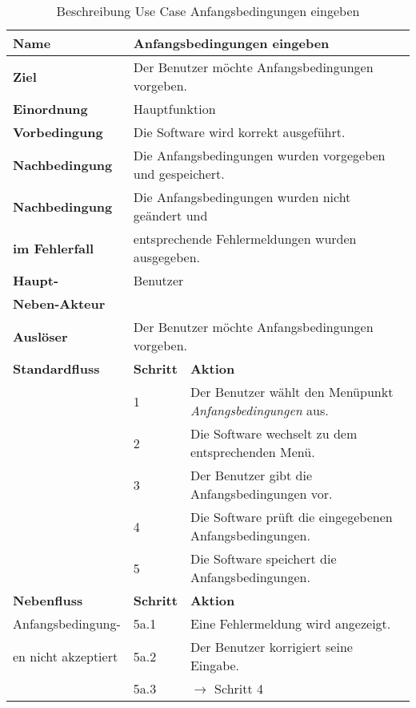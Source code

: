 \begin{table} [H]
	\centering
	\begin{tabular}{|l|l|l|}
		\hline
		\textbf{Name} 			& \multicolumn{2}{|l|}{Anfangsbedingungen eingeben}  \\
		\hline
		\textbf{Ziel} 			& \multicolumn{2}{|l|}{Der Benutzer möchte Anfangsbedingungen vorgeben. }\\ 
		\hline
		\textbf{Einordnung}		& \multicolumn{2}{|l|}{Hauptfunktion}\\
		\hline
		\textbf{Vorbedingung}	& \multicolumn{2}{|l|}{Die Software wird korrekt ausgeführt.} \\
		\hline
		\textbf{Nachbedingung}	& \multicolumn{2}{|l|}{Die Anfangsbedingungen wurden vorgegeben und gespeichert.}\\
		\hline
		\textbf{Nachbedingung} 	& \multicolumn{2}{|l|}{Die Anfangsbedingungen wurden nicht geändert und}\\
		\textbf{im Fehlerfall}	& \multicolumn{2}{|l|}{entsprechende Fehlermeldungen wurden ausgegeben.}\\
		\hline
		\textbf{Haupt-} 			& \multicolumn{2}{|l|}{Benutzer}\\
		\textbf{Neben-Akteur}	& \multicolumn{2}{|l|}{	}			\\
		\hline
		\textbf{Auslöser} 		& \multicolumn{2}{|l|}{Der Benutzer möchte Anfangsbedingungen vorgeben.} \\
		\hline 
		\textbf{Standardfluss} & \textbf{Schritt} & \textbf{Aktion} \\
		\hline
		&	1	& Der Benutzer wählt den Menüpunkt \emph{Anfangsbedingungen} aus. \\
		\cline{2-3}
		&	2	& Die Software wechselt zu dem entsprechenden Menü.\\
		\cline{2-3}
		&	3	& Der Benutzer gibt die Anfangsbedingungen vor.\\
		\cline{2-3}
		&	4	& Die Software prüft die eingegebenen Anfangsbedingungen.\\
		\cline{2-3}
		&	5	& Die Software speichert die Anfangsbedingungen.\\
		\hline
		\textbf{Nebenfluss} & \textbf{Schritt} & \textbf{Aktion}\\
		\hline
		Anfangsbedingung-  & 5a.1 & Eine Fehlermeldung wird angezeigt.\\
		\cline{2-3}
		en nicht akzeptiert 	& 5a.2	& Der Benutzer korrigiert seine Eingabe.\\
		\cline{2-3}
					& 5a.3 	& $\rightarrow$ Schritt 4\\
		\hline
	\end{tabular}
	\caption{Beschreibung Use Case Anfangsbedingungen eingeben}
	\label{Beschreibung Use Case Anfangsbedingungen_eingeben}
\end{table}


